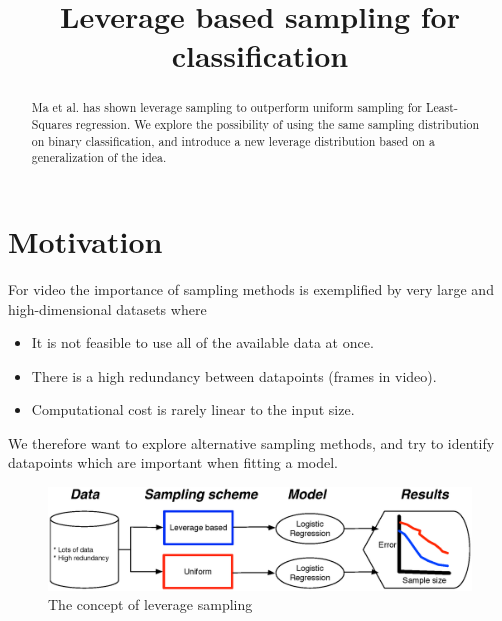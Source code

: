 \documentclass{article}
\title{Leverage based sampling for classification }
\begin{document}
%

\maketitle
%
\begin{abstract}
%
Ma et al. \cite{Ma} has shown leverage sampling to outperform uniform sampling for Least-Squares regression. We explore the possibility of using the same sampling distribution on binary classification, and introduce a new leverage distribution based on a generalization of the idea.
%
\end{abstract}

\section{Motivation}
For video the importance of sampling methods is exemplified by very large and high-dimensional datasets where

\begin{itemize}
\item It is not feasible to use all of the available data at once.
\item There is a high redundancy between datapoints (frames in video).
\item Computational cost is rarely linear to the input size.
\end{itemize}

We therefore want to explore alternative sampling methods, and try to identify datapoints which are important when fitting a model.
%

\begin{figure}[b]
\centering
\includegraphics[width=\linewidth]{images/ThoughtModel}
\caption{The concept of leverage sampling}
\label{fig:concept}
\end{figure}
\end{document}
